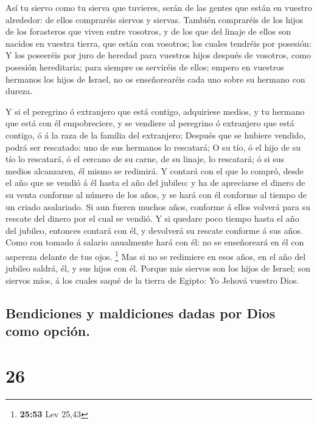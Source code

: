  Así tu siervo como tu sierva que tuvieres, serán de las
gentes que están en vuestro alrededor: de ellos compraréis siervos y
siervas.  También compraréis de los hijos de los
forasteros que viven entre vosotros, y de los que del linaje de ellos
son nacidos en vuestra tierra, que están con vosotros; los cuales
tendréis por posesión:  Y los poseeréis por juro de
heredad para vuestros hijos después de vosotros, como posesión
hereditaria; para siempre os serviréis de ellos; empero en vuestros
hermanos los hijos de Israel, no os enseñorearéis cada uno sobre su
hermano con dureza.

 Y si el peregrino ó extranjero que está contigo,
adquiriese medios, y tu hermano que está con él empobreciere, y se
vendiere al peregrino ó extranjero que está contigo, ó á la raza de la
familia del extranjero;  Después que se hubiere vendido,
podrá ser rescatado: uno de sus hermanos lo rescatará;  O
su tío, ó el hijo de su tío lo rescatará, ó el cercano de su carne, de
su linaje, lo rescatará; ó si sus medios alcanzaren, él mismo se
redimirá.  Y contará con el que lo compró, desde el año
que se vendió á él hasta el año del jubileo: y ha de apreciarse el
dinero de su venta conforme al número de los años, y se hará con él
conforme al tiempo de un criado asalariado.  Si aun
fueren muchos años, conforme á ellos volverá para su rescate del dinero
por el cual se vendió.  Y si quedare poco tiempo hasta el
año del jubileo, entonces contará con él, y devolverá su rescate
conforme á sus años.  Como con tomado á salario
anualmente hará con él: no se enseñoreará en él con aspereza delante de
tus ojos. \footnote{\textbf{25:53} Lev 25,43}  Mas si no
se redimiere en esos años, en el año del jubileo saldrá, él, y sus hijos
con él.  Porque mis siervos son los hijos de Israel; son
siervos míos, á los cuales saqué de la tierra de Egipto: Yo Jehová
vuestro Dios.

\hypertarget{bendiciones-y-maldiciones-dadas-por-dios-como-opciuxf3n.}{%
\subsection{Bendiciones y maldiciones dadas por Dios como
opción.}\label{bendiciones-y-maldiciones-dadas-por-dios-como-opciuxf3n.}}

\hypertarget{section-25}{%
\section{26}\label{section-25}}


